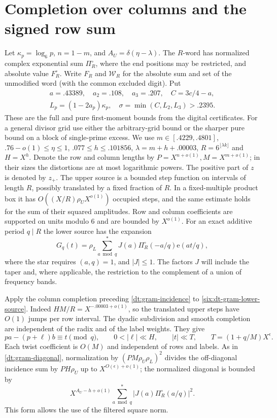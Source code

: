 \documentclass[11pt,a4paper]{article}
\theoremstyle{paperplain}
\numberwithin{equation}{section}
\newcommand{\e}{\mathrm e}
\begin{document}
\section{Completion over columns and the signed row sum}\label{six:dt-gram}
Let $\kappa_p=\log_6p$, $n=1-m$, and $A_U=\delta(\eta-\lambda)$.
The $R$-word has normalized complex exponential sum $\Pi_R^\circ$,
where the end positions may be restricted, and absolute value $F_R^\circ$.
Write $F_R$ and $\mathcal W_R$ for the absolute sum and set of the unmodified
word (with the common excluded digit). Put
\[
 \begin{gathered}
 a=.43389,\quad a_2=.108,\quad a_3=.207,\quad C=3c/4-a,\\
 L_p=(1-2a_p)\kappa_p,\quad \sigma=\min(C,L_2,L_3)>.2395 .
 \end{gathered}
\]
These are the full and pure first-moment bounds from the digital
certificates. For a general divisor grid use either the arbitrary-grid
bound or the sharper pure bound on a block of single-prime excess.
We use $m\in[.4229,.4801]$, $.76-o(1)\le\eta\le 1$,
$.077\le h\le .101856$, $\lambda=m+h+.00003$,
$R=6^{\lfloor\lambda k\rfloor}$ and $H=X^h$.
Denote the row and column lengths by $P=X^{n+o(1)}, M=X^{m+o(1)}$;
in their sizes the distortions are at most logarithmic powers.
The positive part of $z$ is denoted by $z_+$.
The upper source is a bounded step function on intervals of
length \(R\), possibly translated by a fixed fraction of \(R\).
In a fixed-multiple product box it has
\(O((X/R)\rho_U X^{o(1)})\) occupied steps, and the same estimate
holds for the sum of their squared amplitudes. Row and column
coefficients are supported on units modulo \(6\) and are bounded
by \(X^{o(1)}\). For an exact additive period \(q\mid R\) the lower
source has the expansion
\begin{equation}
 G_q(t)=\rho_L\sum_{a\bmod q}^{*}
                    J(a)\Pi_R^\circ(-a/q)\e(at/q),
 \label{six:dt-gram-lower-source}
\end{equation}
where the star requires \((a,q)=1\), and \(|J|\le1\).
The factors \(J\) will include the taper and, where applicable,
the restriction to the complement of a union of frequency bands.

Apply the column completion preceding \eqref{dt:gram-incidence} to
\eqref{six:dt-gram-lower-source}. Indeed $HM/R=X^{-.00003+o(1)}$,
so the translated upper steps have $O(1)$ jumps per row interval.
The dyadic subdivision and smooth completion are independent of the
radix and of the label weights. They give
\begin{equation}
 p a-(p+\ell)b\equiv t\pmod q,\qquad
      0<|\ell|\ll H,\qquad |t|\ll T,\qquad
      T=(1+q/M)X^\epsilon .
 \label{six:dt-gram-incidence}
\end{equation}
Each twist coefficient is $O(M)$ and independent of rows and labels.
As in \eqref{dt:gram-diagonal}, normalization by $(PM\rho_U\rho_L)^2$
divides the off-diagonal incidence sum by $PH\rho_U$ up to
$X^{O(\epsilon)+o(1)}$; the normalized diagonal is bounded by
\begin{equation}
 X^{A_U-h+o(1)}
              \sum_{a\bmod q}^{*}|J(a)\Pi_R^\circ(a/q)|^2 .
 \label{six:dt-gram-diagonal}
\end{equation}
This form allows the use of the filtered square norm.
\end{document}

